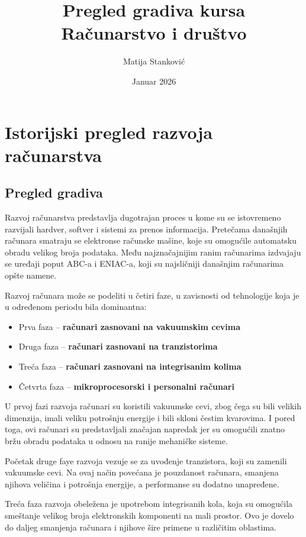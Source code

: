 \documentclass[a4paper, 12pt]{article}
\title{Pregled gradiva kursa \\ \large Računarstvo i društvo}
\author{Matija Stanković}
\date{Januar 2026}
\begin{document}
\maketitle
\newpage
\tableofcontents
\newpage


\section{Istorijski pregled razvoja računarstva}
\subsection{Pregled gradiva}
Razvoj računarstva predstavlja dugotrajan proces u kome su se istovremeno razvijali
hardver, softver i sistemi za prenos informacija. Pretečama današnjih računara smatraju se elektronse računske mašine, koje su omogućile automatsku obradu
velikog broja podataka. Među najznačajnijim ranim računarima izdvajaju se uređaji poput
ABC-a i ENIAC-a, koji su najsličniji današnjim računarima opšte namene.

Razvoj računara može se podeliti u četiri faze, u zavisnosti od tehnologije koja je u
određenom periodu bila dominantna:
\begin{itemize}
    \item Prva faza – \textbf{računari zasnovani na vakuumskim cevima}
    \item Druga faza – \textbf{računari zasnovani na tranzistorima}
    \item Treća faza – \textbf{računari zasnovani na integrisanim kolima}
    \item Četvrta faza – \textbf{mikroprocesorski i personalni računari}
\end{itemize}

U prvoj fazi razvoja računari su koristili vakuumske cevi, zbog čega su bili velikih
dimenzija, imali veliku potrošnju energije i bili skloni čestim kvarovima. I pored
toga, ovi računari su predstavljali značajan napredak jer su omogućili znatno bržu
obradu podataka u odnosu na ranije mehaničke sisteme.

Početak druge faye razvoja vezuje se za uvođenje tranzistora, koji su zamenili vakuumske cevi.
Na ovaj način povećana je pouzdanost računara, smanjena njihova veličina i potrošnja
energije, a performanse su dodatno unapređene.

Treća faza razvoja obeležena je upotrebom integrisanih kola, koja su omogućila smeštanje
velikog broja elektronskih komponenti na mali prostor. Ovo je dovelo do daljeg smanjenja
računara i njihove šire primene u različitim oblastima.
\end{document}
